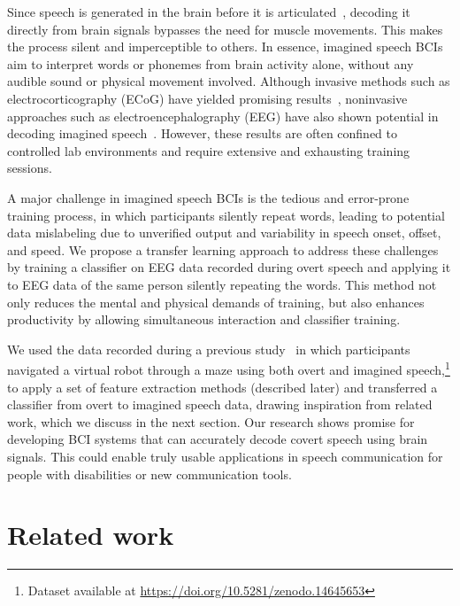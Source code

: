 \documentclass[onecolumn]{IEEEtran}
\begin{document}
Since speech is generated in the brain before it is articulated~\cite{brumberg2016spatio}, 
decoding it directly from brain signals bypasses the need for muscle movements. 
This makes the process silent and imperceptible to others. 
In essence, imagined speech BCIs aim to interpret words or phonemes from brain activity alone, 
without any audible sound or physical movement involved.
Although invasive methods such as electrocorticography (ECoG) have yielded promising results~\cite{proix2022imagined,luo2023brain}, noninvasive approaches such as electroencephalography (EEG) 
have also shown potential in decoding imagined speech~\cite{lopez2022state,reddy2024multivariate}. 
However, these results are often confined to controlled lab environments and require extensive and exhausting training sessions.

A major challenge in imagined speech BCIs is the tedious and error-prone training process, in which participants silently repeat words, leading to potential data mislabeling
due to unverified output and variability in speech onset, offset, and speed. 
We propose a transfer learning approach to address these challenges
by training a classifier on EEG data recorded during overt speech
and applying it to EEG data of the same person silently repeating the words. 
This method not only reduces the mental and physical demands of training,
but also enhances productivity by allowing simultaneous interaction and classifier training.

We used the data recorded during a previous study~\cite{rekrut2022improving} in which participants navigated a virtual robot through a maze 
using both overt and imagined speech,\footnote{Dataset available at \url{https://doi.org/10.5281/zenodo.14645653}} 
to apply a set of feature extraction methods (described later) 
and transferred a classifier from overt to imagined speech data, 
drawing inspiration from related work, which we discuss in the next section.
Our research shows promise for developing BCI systems that can accurately decode covert speech using brain signals. 
This could enable truly usable applications in speech communication 
for people with disabilities or new communication tools.

\section{Related work}
\label{sec:relatedwork}
\end{document}
